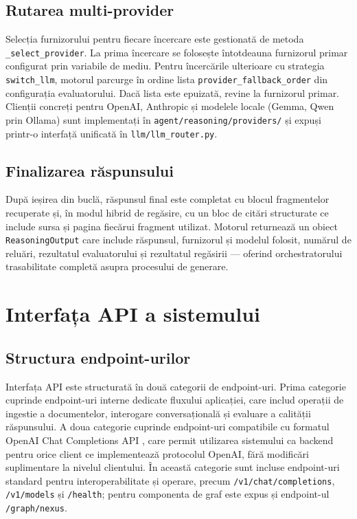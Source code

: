 \documentclass[12pt, a4paper, oneside, romanian]{teza-upb}
\begin{document}
\subsection{Rutarea multi-provider}

Selecția furnizorului pentru fiecare încercare este gestionată de metoda \texttt{\_select\_provider}. La prima încercare se folosește întotdeauna furnizorul primar configurat prin variabile de mediu. Pentru încercările ulterioare cu strategia \texttt{switch\_llm}, motorul parcurge în ordine lista \texttt{provider\_fallback\_order} din configurația evaluatorului. Dacă lista este epuizată, revine la furnizorul primar. Clienții concreți pentru OpenAI, Anthropic și modelele locale (Gemma, Qwen prin Ollama) sunt implementați în \texttt{agent/reasoning/providers/} și expuși printr-o interfață unificată în \texttt{llm/llm\_router.py}.

\subsection{Finalizarea răspunsului}

După ieșirea din buclă, răspunsul final este completat cu blocul fragmentelor recuperate și, în modul hibrid de regăsire, cu un bloc de citări structurate ce include sursa și pagina fiecărui fragment utilizat. Motorul returnează un obiect \texttt{ReasoningOutput} care include răspunsul, furnizorul și modelul folosit, numărul de reluări, rezultatul evaluatorului și rezultatul regăsirii — oferind orchestratorului trasabilitate completă asupra procesului de generare.


\section{Interfața API a sistemului}

\subsection{Structura endpoint-urilor}

Interfața API este structurată în două categorii de endpoint-uri. Prima categorie cuprinde endpoint-uri interne dedicate fluxului aplicației, care includ operații de ingestie a documentelor, interogare conversațională și evaluare a calității răspunsului. A doua categorie cuprinde endpoint-uri compatibile cu formatul OpenAI Chat Completions API \cite{openai_api}, care permit utilizarea sistemului ca backend pentru orice client ce implementează protocolul OpenAI, fără modificări suplimentare la nivelul clientului. În această categorie sunt incluse endpoint-uri standard pentru interoperabilitate și operare, precum \texttt{/v1/chat/completions}, \texttt{/v1/models} și \texttt{/health}; pentru componenta de graf este expus și endpoint-ul \texttt{/graph/nexus}.
\end{document}
